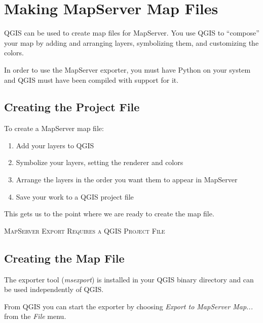 \section{Making MapServer Map Files}\label{sec:mapserver_export}

QGIS can be used to create map files for MapServer. You use QGIS to
``compose'' your map by adding and arranging layers, symbolizing them, and
customizing the colors.

In order to use the MapServer exporter, you must have Python on your
system and QGIS must have been compiled with support for it.

\subsection{Creating the Project File}

To create a MapServer map file:

\begin{enumerate}
\item Add your layers to QGIS
\item Symbolize your layers, setting the renderer and colors
\item Arrange the layers in the order you want them to appear in MapServer
\item Save your work to a QGIS project file
\end{enumerate} 

This gets us to the point where we are ready to create the map file.

\begin{Tip}\caption{\textsc{MapServer Export Requires a QGIS Project File}}
\end{Tip} 

\subsection{Creating the Map File}

The exporter tool (\textsl{msexport}) is installed in your QGIS binary directory and can be
used independently of QGIS. 

From QGIS you can start the exporter by choosing \textsl{Export to MapServer
  Map...} from the \textsl{File} menu.

